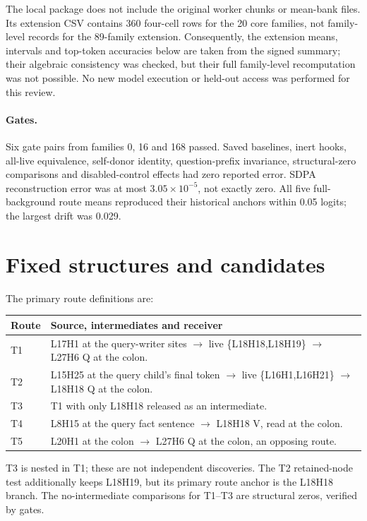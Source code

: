 \documentclass[11pt,a4paper]{article}
\begin{document}
The local package does not include the original worker chunks or mean-bank
files. Its extension CSV contains 360 four-cell rows for the 20 core families,
not family-level records for the 89-family extension. Consequently, the extension
means, intervals and top-token accuracies below are taken from the signed
summary; their algebraic consistency was checked, but their full family-level
recomputation was not possible. No new model execution or held-out access was
performed for this review.

\paragraph{Gates.}
Six gate pairs from families 0, 16 and 168 passed. Saved baselines, inert hooks,
all-live equivalence, self-donor identity, question-prefix invariance,
structural-zero comparisons and disabled-control effects had zero reported
error. SDPA reconstruction error was at most $3.05\times10^{-5}$, not exactly
zero. All five full-background route means reproduced their historical anchors
within 0.05 logits; the largest drift was 0.029.

\section{Fixed structures and candidates}
The primary route definitions are:
\begin{center}\small
\begin{tabular}{@{}lp{13.8cm}@{}}
\toprule
Route & Source, intermediates and receiver \\
\midrule
T1 & L17H1 at the query-writer sites $\to$ live \{L18H18,L18H19\} $\to$ L27H6 Q at the colon.\\
T2 & L15H25 at the query child's final token $\to$ live \{L16H1,L16H21\} $\to$ L18H18 Q at the colon.\\
T3 & T1 with only L18H18 released as an intermediate.\\
T4 & L8H15 at the query fact sentence $\to$ L18H18 V, read at the colon.\\
T5 & L20H1 at the colon $\to$ L27H6 Q at the colon, an opposing route.\\
\bottomrule
\end{tabular}
\end{center}
T3 is nested in T1; these are not independent discoveries. The T2 retained-node
test additionally keeps L18H19, but its primary route anchor is the L18H18 branch.
The no-intermediate comparisons for T1--T3 are structural zeros, verified by gates.
\end{document}
